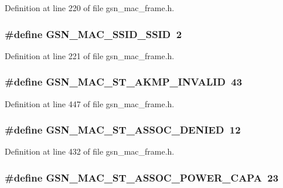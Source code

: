 Definition at line 220 of file gsn\_\-mac\_\-frame.h.

\hypertarget{a00523_aa4e79dcd7015cc342c8d57893a7cd0fc}{
\subsubsection[{GSN\_\-MAC\_\-SSID\_\-SSID}]{\setlength{\rightskip}{0pt plus 5cm}\#define GSN\_\-MAC\_\-SSID\_\-SSID~2}}
\label{a00523_aa4e79dcd7015cc342c8d57893a7cd0fc}


Definition at line 221 of file gsn\_\-mac\_\-frame.h.

\hypertarget{a00523_a916a1c88dab1d3ff4e11d5285af162fb}{
\subsubsection[{GSN\_\-MAC\_\-ST\_\-AKMP\_\-INVALID}]{\setlength{\rightskip}{0pt plus 5cm}\#define GSN\_\-MAC\_\-ST\_\-AKMP\_\-INVALID~43}}
\label{a00523_a916a1c88dab1d3ff4e11d5285af162fb}


Definition at line 447 of file gsn\_\-mac\_\-frame.h.

\hypertarget{a00523_a284ee0a62db19ecd2cbde145eecd97a2}{
\subsubsection[{GSN\_\-MAC\_\-ST\_\-ASSOC\_\-DENIED}]{\setlength{\rightskip}{0pt plus 5cm}\#define GSN\_\-MAC\_\-ST\_\-ASSOC\_\-DENIED~12}}
\label{a00523_a284ee0a62db19ecd2cbde145eecd97a2}


Definition at line 432 of file gsn\_\-mac\_\-frame.h.

\hypertarget{a00523_a5b015b54f4401ea85c0d9d3913250d07}{
\subsubsection[{GSN\_\-MAC\_\-ST\_\-ASSOC\_\-POWER\_\-CAPA}]{\setlength{\rightskip}{0pt plus 5cm}\#define GSN\_\-MAC\_\-ST\_\-ASSOC\_\-POWER\_\-CAPA~23}}
\label{a00523_a5b015b54f4401ea85c0d9d3913250d07}


